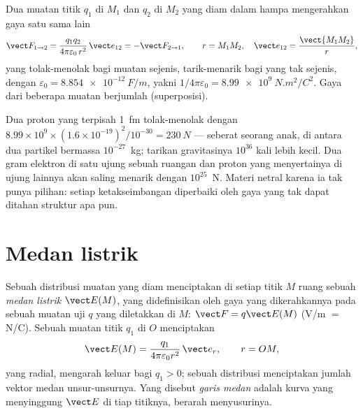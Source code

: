 \begin{theorem}\label{thm:b1:electrostatics-gauss:coulomb}
Dua muatan titik $q_1$ di $M_1$ dan $q_2$ di $M_2$ yang diam dalam hampa
mengerahkan gaya satu sama lain
\[
\vect F_{1 \to 2} = \frac{q_1q_2}{4\pi\varepsilon_0\,r^2}\,\vect e_{12} = -\vect F_{2 \to 1},
\qquad r = M_1M_2,\quad \vect e_{12} = \frac{\vect{M_1M_2}}{r},
\]
yang tolak-menolak bagi muatan sejenis, tarik-menarik bagi yang tak sejenis, dengan
\emph{} $\varepsilon_0 = \qty{8.854e-12}{F/m}$, yakni
$1/4\pi\varepsilon_0 = \qty{8.99e9}{N.m^2/C^2}$. Gaya dari beberapa muatan berjumlah
(superposisi).
\end{theorem}
\admitted

\begin{example}\label{ex:b1:electrostatics-gauss:strong}
Dua proton yang terpisah \qty{1}{fm} tolak-menolak dengan $8.99 \times 10^9 \times (1.6 \times
10^{-19})^2/10^{-30} = \qty{230}{N}$ --- seberat seorang anak, di antara dua
partikel bermassa $10^{-27}$~kg; tarikan gravitasinya
$10^{36}$ kali lebih kecil. Dua gram elektron di satu ujung sebuah ruangan
dan proton yang menyertainya di ujung lainnya akan saling menarik dengan $10^{25}$~N.
Materi netral karena ia tak punya pilihan: setiap ketakseimbangan diperbaiki
oleh gaya yang tak dapat ditahan struktur apa pun.
\end{example}

\section{Medan listrik}

\begin{definition}\label{def:b1:electrostatics-gauss:field}
Sebuah distribusi muatan yang diam menciptakan di setiap titik $M$ ruang
sebuah \emph{medan listrik} $\vect E(M)$, yang didefinisikan oleh gaya yang dikerahkannya pada
sebuah muatan uji $q$ yang diletakkan di $M$: $\vect F = q\vect E(M)$ (\unit{V/m} $=$
\unit{N/C}). Sebuah muatan titik $q_1$ di $O$ menciptakan
\[
\vect E(M) = \frac{q_1}{4\pi\varepsilon_0 r^2}\,\vect e_r , \qquad r = OM ,
\]
yang radial, mengarah keluar bagi $q_1 > 0$; sebuah distribusi menciptakan jumlah vektor
medan unsur-unsurnya. Yang disebut \emph{garis medan} adalah kurva yang menyinggung
$\vect E$ di tiap titiknya, berarah menyusurinya.
\end{definition}

